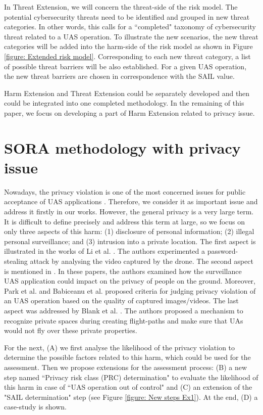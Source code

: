 \documentclass[a4paper, 10, conference]{ieeeconf}  %
\begin{document}
In Threat Extension, we will concern the threat-side of the risk model. The potential cybersecurity threats need to be identified and grouped in new threat categories. In other words, this calls for a ``completed" taxonomy of cybersecurity threat related to a UAS operation. To illustrate the new scenarios, the new threat categories will be added into the harm-side of the risk model as shown in Figure \ref{figure: Extended risk model}. Corresponding to each new threat category, a list of possible threat barriers will be also established. For a given UAS operation, the new threat barriers are chosen in correspondence with the SAIL value. 

Harm Extension and Threat Extension could be separately developed and then could be integrated into one completed methodology. In the remaining of this paper, we focus on developing a part of Harm Extension related to privacy issue. 

\section{SORA methodology with privacy issue} \label{sec:newharm}

Nowadays, the privacy violation is one of the most concerned issues for public acceptance of UAS applications \cite{SORAV1, 7383633, Zhi2019}. Therefore, we consider it as important issue and address it firstly in our works. However, the general privacy is a very large term. It is difficult to define precisely \cite{Finn2013} and address this term at large, so we focus on only three aspects of this harm: (1) disclosure of personal information; (2) illegal personal surveillance; and (3) intrusion into a private location. The first aspect is illustrated in the works of Li et al. \cite{8685611}. The authors experimented a password-stealing attack by analysing the video captured by the drone.  The second aspect is mentioned in \cite{Johnvilla_privacy, 7883702, 7285023}. In these papers, the authors examined how the surveillance UAS application could impact on the privacy of people on the ground. Moreover, Park et al. \cite{7883702} and Babiceanu et al. \cite{7121232} proposed criteria for judging privacy violation of an UAS operation based on the quality of captured images/videos. The last aspect was addressed by Blank et al. \cite{8328983}. The authors proposed a mechanism to recognize private spaces during creating flight-paths and make sure that UAs would not fly over these private properties.

For the next, (A) we first analyse the likelihood of the privacy violation to determine the possible factors related to this harm, which could be used for the assessment. Then we propose extensions for the assessment process: (B) a new step named ``Privacy risk class (PRC) determination" to evaluate the likelihood of this harm in case of ``UAS operation out of control" and (C) an extension of the "SAIL determination" step (see Figure \ref{figure: New steps Ex1}). At the end, (D) a case-study is shown. 
\end{document}
